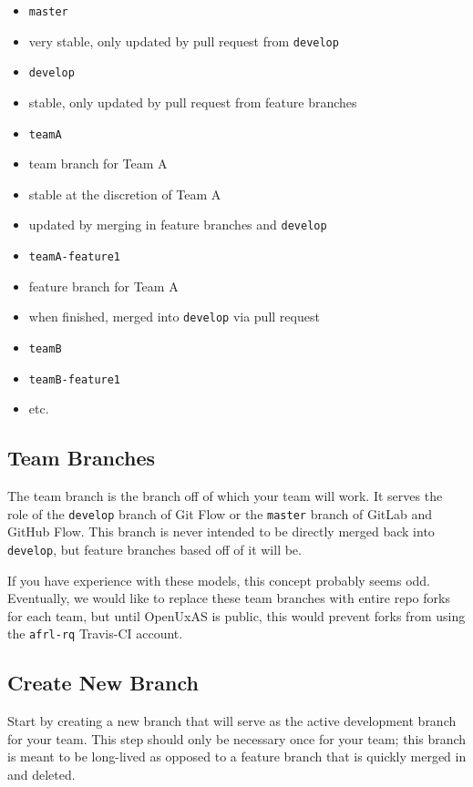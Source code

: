 \begin{itemize}
\item
  \texttt{master}
\item
  very stable, only updated by pull request from \texttt{develop}
\item
  \texttt{develop}
\item
  stable, only updated by pull request from feature branches
\item
  \texttt{teamA}
\item
  team branch for Team A
\item
  stable at the discretion of Team A
\item
  updated by merging in feature branches and \texttt{develop}
\item
  \texttt{teamA-feature1}
\item
  feature branch for Team A
\item
  when finished, merged into \texttt{develop} via pull request
\item
  \texttt{teamB}
\item
  \texttt{teamB-feature1}
\item
  etc.
\end{itemize}

\subsection{Team Branches}\label{team-branches}

The team branch is the branch off of which your team will work. It
serves the role of the \texttt{develop} branch of Git Flow or the
\texttt{master} branch of GitLab and GitHub Flow. This branch is never
intended to be directly merged back into \texttt{develop}, but feature
branches based off of it will be.

If you have experience with these models, this concept probably seems
odd. Eventually, we would like to replace these team branches with
entire repo forks for each team, but until OpenUxAS is public, this
would prevent forks from using the \texttt{afrl-rq} Travis-CI account.

\subsection{Create New Branch}\label{create-new-branch}

Start by creating a new branch that will serve as the active development
branch for your team. This step should only be necessary once for your
team; this branch is meant to be long-lived as opposed to a feature
branch that is quickly merged in and deleted.

